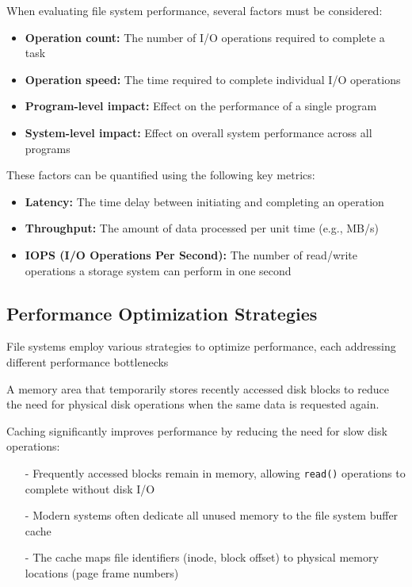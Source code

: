 \documentclass[../../compsys.tex]{subfiles}
\begin{document}
When evaluating file system performance, several factors must be considered:

\begin{itemize}
  \item \textbf{Operation count:} The number of I/O operations required to complete a task
  \item \textbf{Operation speed:} The time required to complete individual I/O operations
  \item \textbf{Program-level impact:} Effect on the performance of a single program
  \item \textbf{System-level impact:} Effect on overall system performance across all programs
\end{itemize}

These factors can be quantified using the following key metrics:

\begin{itemize}
  \item \textbf{Latency:} The time delay between initiating and completing an operation
  \item \textbf{Throughput:} The amount of data processed per unit time (e.g., MB/s)
  \item \textbf{IOPS (I/O Operations Per Second):} The number of read/write operations a storage system can perform in one second
\end{itemize}
\newpage
\subsection{Performance Optimization Strategies}

File systems employ various strategies to optimize performance, each addressing different performance bottlenecks \\[5px]

\begin{definition}
A memory area that temporarily stores recently accessed disk blocks to reduce the need for physical disk operations when the same data is requested again.
\end{definition}

Caching significantly improves performance by reducing the need for slow disk operations:
\begin{itemize}
  \item[-] Frequently accessed blocks remain in memory, allowing \texttt{read()} operations to complete without disk I/O
  \item[-] Modern systems often dedicate all unused memory to the file system buffer cache
  \item[-] The cache maps file identifiers (inode, block offset) to physical memory locations (page frame numbers)
\end{itemize}
\end{document}
